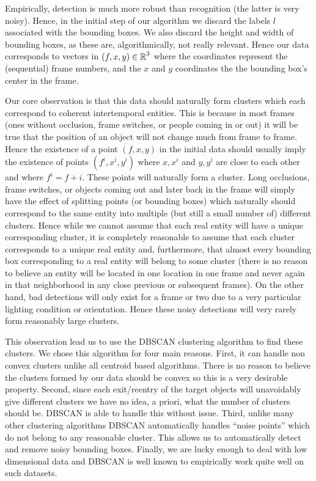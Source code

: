 \documentclass{article}
\begin{document}
Empirically, detection is much more robust than recognition (the latter is very noisy). Hence, in the initial step of our algorithm we discard the labels $l$ associated with the 
bounding boxes. We also discard the height and width of bounding boxes, as these are, algorithmically, not really relevant. Hence our data corresponds to vectors in $(f, x, y) \in \operatorname{\mathbb{R}}^3$ where the coordinates 
represent the (sequential) frame numbers, and the $x$ and $y$ coordinates the the bounding box's center in the frame.

Our core observation is that this data should naturally form clusters which each correspond to coherent intertemporal entities. This is because in most frames (ones without occlusion, frame switches, or people
coming in or out) it will be true that the position of an object will not change much from frame to frame. Hence the existence of a point $(f, x, y)$ in the initial data should usually imply the existence 
of points $(f^i, x^i, y^i)$ where $x, x^i$ and $y, y^i$ are close to each other and where $f^i = f + i$. These points will naturally form a cluster. Long occlusions, frame switches, or objects coming out and
later back in the frame will simply have the effect of splitting points (or bounding boxes) which naturally should correspond to the same entity into multiple (but still a small number of) different clusters.
Hence while we cannot assume that each real entity will have a unique corresponding cluster, it is completely reasonable to assume that each cluster corresponds to a unique real entity and, furthermore, that
almost every bounding box corresponding to a real entity will belong to some cluster (there is no reason to believe an entity will be located in one location in one frame and never again in 
that neighborhood in any close previous or subsequent frames). On the other hand, bad detections will only exist for a frame or two due to a very particular lighting condition or orientation. Hence these 
noisy detections will very rarely form reasonably large clusters.

This observation lead us to use the DBSCAN \cite{dbscan} clustering algorithm to find these clusters. We chose this algorithm for four main reasons. First, it can handle non convex clusters unlike all centroid
based algorithms. There is no reason to believe the clusters formed by our data should be convex so this is a very desirable property. Second, since each exit/reentry of the target objects will unavoidably 
give different clusters we have no idea, a priori, what the number of clusters should be. DBSCAN is able to handle this without issue. Third, unlike many other clustering algorithms 
DBSCAN automatically handles ``noise points'' which do not belong to any reasonable cluster. This allows us to automatically detect and remove noisy bounding boxes. Finally, we are lucky enough to deal 
with low dimensional data and DBSCAN is well known to empirically work quite well on such datasets.
\end{document}

